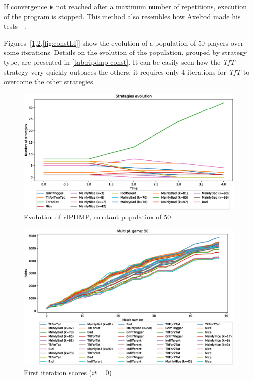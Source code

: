 \documentclass[journal,a4paper,10pt,twoside]{IEEEtran} %
\begin{document}
If convergence is not reached after a maximum number of repetitions, execution of the program is stopped.
This method also resembles how Axelrod made his tests~\cite[\S 2.6]{mathieu2017}~\cite{axelrod1984evolution}.

Figures~[\ref{fig:constR},\ref{fig:constFI},\ref{fig:constLI}] show the evolution of a population of 50 players over some iterations.
Details on the evolution of the population, grouped by strategy type, are presented in \autoref{tab:ripdmp-const}.
It can be easily seen how the \textit{TfT} strategy very quickly outpaces the others: it requires only $4$ iterations for \textit{TfT} to overcome the other strategies.

\begin{figure}[!ht]
    \centering
    \includegraphics[width=1\columnwidth]{../img/ripdmp-const/ripdmp-evolution-const-pop-50}
    \caption{Evolution of rIPDMP, constant population of 50}
    \label{fig:constR}
\end{figure}

\begin{figure}[!ht]
    \centering
    \includegraphics[width=1\columnwidth]{../img/ripdmp-const/ripdmp-scores-const-pop-50-r0}
    \caption{First iteration scores ($it=0$)}
    \label{fig:constFI}
\end{figure}
\end{document}
